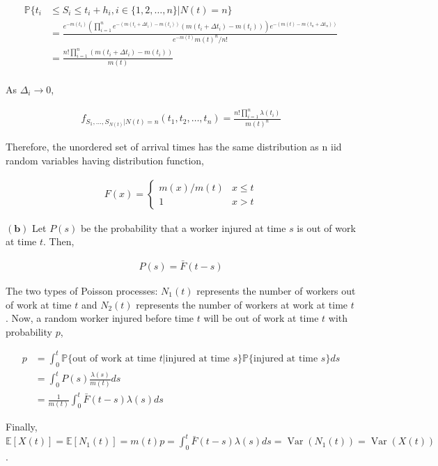 \documentclass{article}
\begin{document}
\begin{align*}
\mathbb{P}\{t_i & \leq S_i \leq t_i + h_i, i \in \{1,2,\ldots,n\}|N(t)=n \} \\
&= \frac{e^{-m(t_1)}\left(\prod\limits_{i=1}^{n}e^{-(m(t_i+\Delta t_i)-m(t_i))}(m(t_i+\Delta t_i)-m(t_i))\right) e^{-(m(t)-m(t_n+\Delta t_n))}}{e^{-m(t)}m(t)^{n}/n!} \\
&= \frac{n!\prod\limits_{i=1}^{n}(m(t_i+\Delta t_i)-m(t_i))}{m(t)}\\
\end{align*}

As $\Delta_i \rightarrow 0$,

\begin{align*}
f_{S_1,\ldots,S_{N(t)}|N(t)=n}(t_1,t_2,\ldots,t_n) = \frac{n!\prod_{i=1}^{n}\lambda(t_i)}{m(t)^n}
\end{align*}

Therefore, the unordered set of arrival times has the same distribution as n iid random variables having distribution function,

\begin{align*}
F(x) = \left\{\begin{matrix}m(x)/m(t) & x \leq t\\ 1 & x > t\end{matrix}\right.
\end{align*}

$\mathbf{(b)}$ Let $P(s)$ be the probability that a worker injured at time $s$  is out of work at time $t$. Then,

\begin{align*}
P(s) = \bar{F}(t-s)
\end{align*}

The two types of Poisson processes: $N_1(t)$ represents the number of workers out of work at time $t$ and $N_2(t)$ represents the number of workers at  work at time $t$. Now, a random worker injured before time $t$ will be out of work at time $t$ with probability $p$,

\begin{align*}
p &= \int_{0}^{t}\mathbb{P}\{\text{out of work at time }t|\text{injured at time }s\}\mathbb{P}\{\text{injured at time } s\}ds\\
&= \int_{0}^{t}P(s)\frac{\lambda(s)}{m(t)}ds\\
&= \frac{1}{m(t)}\int_{0}^{t}\bar{F}(t-s)\lambda(s)ds
\end{align*}

Finally, $\mathbb{E}[X(t)] = \mathbb{E}[N_1(t)] = m(t)p = \int_{0}^{t}\bar{F}(t-s)\lambda(s)ds = \operatorname{Var}(N_1(t)) = \operatorname{Var}(X(t))$.
\end{document}
